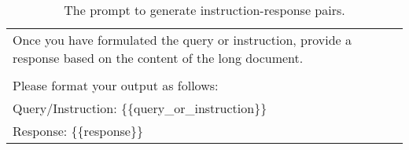 \begin{table}[h!]
\begin{minipage}{\textwidth}
\begin{tcolorbox}
\begin{tabular}{p{}}
    Once you have formulated the query or instruction, provide a response based on the content of the long document.\\
    \\
    Please format your output as follows:\\
    Query/Instruction: \{\{query{\_}or{\_}instruction\}\}\\
    Response: \{\{response\}\}
    \end{tabular}
\end{tcolorbox}
\caption{The prompt to generate instruction-response pairs.}
    \label{tab:prompt_instruct_response}
\end{minipage}
\end{table}



